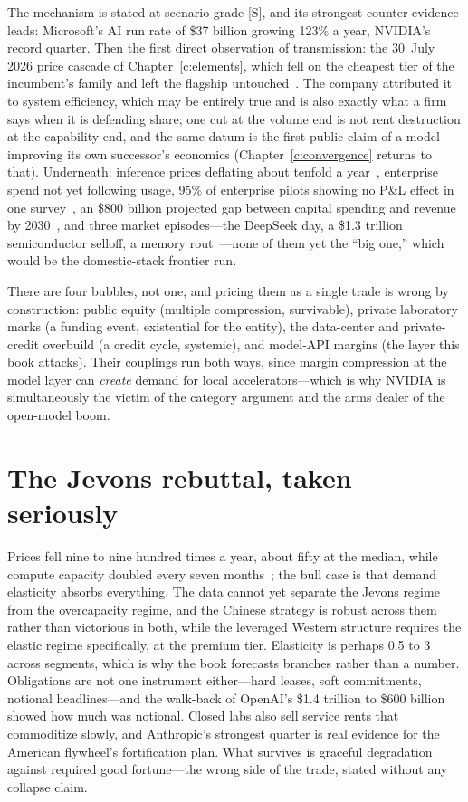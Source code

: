 The mechanism is stated at scenario grade [S], and its strongest counter-evidence leads: Microsoft's AI run rate of \$37 billion growing 123\% a year, NVIDIA's record quarter. Then the first direct observation of transmission: the 30~July 2026 price cascade of Chapter~\ref{c:elements}, which fell on the cheapest tier of the incumbent's family and left the flagship untouched~\cite{openai-cut}. The company attributed it to system efficiency, which may be entirely true and is also exactly what a firm says when it is defending share; one cut at the volume end is not rent destruction at the capability end, and the same datum is the first public claim of a model improving its own successor's economics (Chapter~\ref{c:convergence} returns to that). Underneath: inference prices deflating about tenfold a year~\cite{llmflation}, enterprise spend not yet following usage, 95\% of enterprise pilots showing no P\&L effect in one survey~\cite{mit-nanda}, an \$800 billion projected gap between capital spending and revenue by 2030~\cite{bain-2t}, and three market episodes---the DeepSeek day, a \$1.3 trillion semiconductor selloff, a memory rout~\cite{semis-selloff,memory-rout}---none of them yet the ``big one,'' which would be the domestic-stack frontier run.

There are four bubbles, not one, and pricing them as a single trade is wrong by construction: public equity (multiple compression, survivable), private laboratory marks (a funding event, existential for the entity), the data-center and private-credit overbuild (a credit cycle, systemic), and model-API margins (the layer this book attacks). Their couplings run both ways, since margin compression at the model layer can \emph{create} demand for local accelerators---which is why NVIDIA is simultaneously the victim of the category argument and the arms dealer of the open-model boom.

\section{The Jevons rebuttal, taken seriously}

Prices fell nine to nine hundred times a year, about fifty at the median, while compute capacity doubled every seven months~\cite{epoch-prices,epoch-capacity}; the bull case is that demand elasticity absorbs everything. The data cannot yet separate the Jevons regime from the overcapacity regime, and the Chinese strategy is robust across them rather than victorious in both, while the leveraged Western structure requires the elastic regime specifically, at the premium tier. Elasticity is perhaps 0.5 to 3 across segments, which is why the book forecasts branches rather than a number. Obligations are not one instrument either---hard leases, soft commitments, notional headlines---and the walk-back of OpenAI's \$1.4 trillion to \$600 billion showed how much was notional. Closed labs also sell service rents that commoditize slowly, and Anthropic's strongest quarter is real evidence for the American flywheel's fortification plan. What survives is graceful degradation against required good fortune---the wrong side of the trade, stated without any collapse claim.


